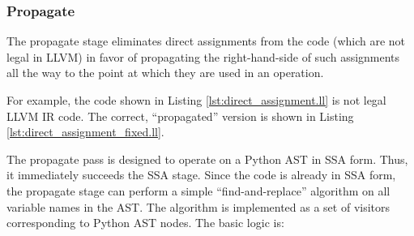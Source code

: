 \documentclass[11pt,twocolumn]{article}
\begin{document}
\subsubsection{Propagate}
\label{sec:stage-Propagate}

The propagate stage eliminates direct assignments from the code (which
are not legal in LLVM) in favor of propagating the right-hand-side of
such assignments all the way to the point at which they are used in an
operation. 

For example, the code shown in Listing \ref{lst:direct_assignment.ll}
is not legal LLVM IR code. The correct, ``propagated'' version is
shown in Listing \ref{lst:direct_assignment_fixed.ll}.





The propagate pass is designed to operate on a Python AST in SSA
form. Thus, it immediately succeeds the SSA stage. Since the code is
already in SSA form, the propagate stage can perform a simple
``find-and-replace'' algorithm on all variable names in the AST. The
algorithm is implemented as a set of visitors corresponding to Python
AST nodes. The basic logic is:
\end{document}

